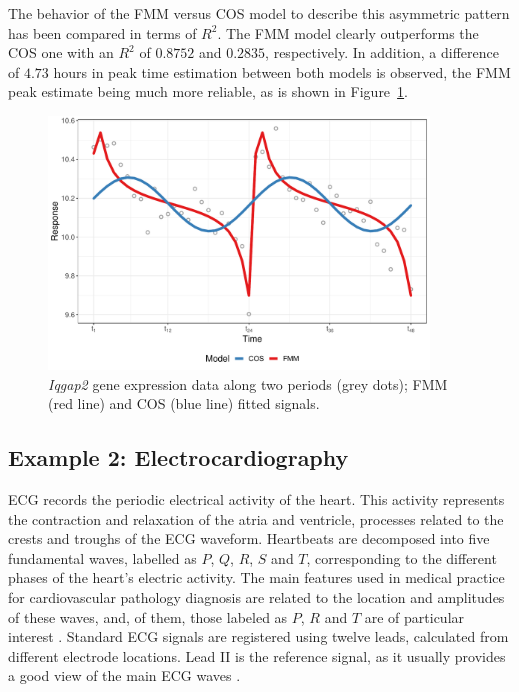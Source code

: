 The behavior of the FMM versus COS model to describe this asymmetric pattern has been compared in terms of $R^2$. The FMM model clearly outperforms the COS one with an $R^2$ of $0.8752$ and $0.2835$, respectively. In addition, a difference of $4.73$ hours in peak time estimation between both models is observed, the FMM peak estimate being much more reliable, as is shown in Figure~\ref{f:chronobiology}.

\begin{figure}[htbp]
	\centering
	\includegraphics[width=0.9\textwidth]{Figure_gene_Example.pdf}
	\caption{\textit{Iqgap2} gene expression data along two periods (grey dots); FMM (red line) and COS (blue line) fitted signals.}
	\label{f:chronobiology}
\end{figure}

\subsection{Example 2: Electrocardiography}\label{subsec:exECG}
ECG records the periodic electrical activity of the heart. This activity represents the contraction and relaxation of the atria and ventricle, processes related to the crests and troughs of the ECG waveform. Heartbeats are decomposed into five fundamental waves, labelled as $P$, $Q$, $R$, $S$ and $T$, corresponding to the different phases of the heart's electric activity. The main features used in medical practice for cardiovascular pathology diagnosis are related to the location and amplitudes of these waves, and, of them, those labeled as $P$, $R$ and $T$ are of particular interest \citep{Bayes:2007}. Standard ECG signals are registered using twelve leads, calculated from different electrode locations. Lead II is the reference signal, as it usually provides a good view of the main ECG waves \citep{Meek+Morris:2002}.

